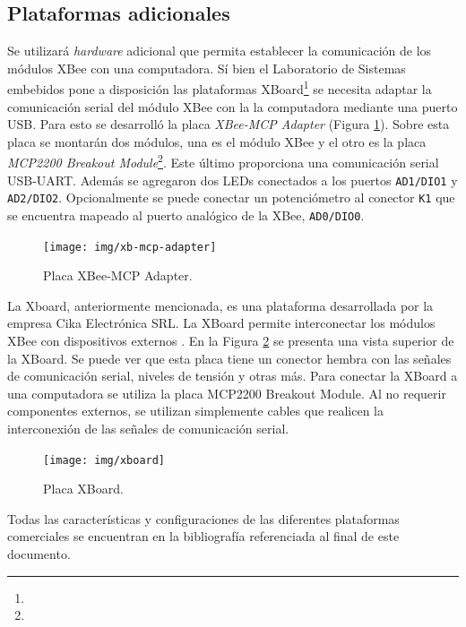 \documentclass[11pt,oneside,spanish,a4paper]{article}
\begin{document}
\subsection{Plataformas adicionales}
\label{sec:plat}

Se utilizará \textsl{hardware} adicional que permita establecer la
comunicación de los módulos XBee con una computadora. Sí bien el
Laboratorio de Sistemas embebidos pone a disposición las plataformas
XBoard\footnote{}
se necesita adaptar la comunicación serial del módulo XBee con la la
computadora mediante una puerto USB. Para esto se desarrolló la placa
\emph{XBee-MCP Adapter} (Figura \ref{fig:xb-mcp-adap}). Sobre esta
placa se montarán dos módulos, una es el módulo XBee y el otro es la
placa \emph{MCP2200 Breakout
  Module}\footnote{}. Este
último proporciona una comunicación serial USB-UART. 
Además se agregaron dos LEDs conectados a los puertos
\texttt{AD1/DIO1} y \texttt{AD2/DIO2}. Opcionalmente se puede conectar
un potenciómetro al conector \texttt{K1} que se encuentra mapeado al
puerto analógico de la XBee, \texttt{AD0/DIO0}.

\begin{figure}[h]
  \centering
  \texttt{[image: img/xb-mcp-adapter]}
  \caption{Placa XBee-MCP Adapter.}
  \label{fig:xb-mcp-adap}
\end{figure}

La Xboard, anteriormente mencionada, es una plataforma desarrollada
por la empresa Cika Electrónica SRL. La XBoard permite interconectar
los módulos XBee con dispositivos externos \cite{xboard}. En la Figura
\ref{fig:xboard} se presenta una vista superior de la XBoard. Se puede
ver que esta placa tiene un conector hembra con las señales de
comunicación serial, niveles de tensión y otras más. Para conectar la
XBoard a una computadora se utiliza la placa MCP2200 Breakout
Module. Al no requerir componentes externos, se utilizan simplemente
cables que realicen la interconexión de las señales de comunicación
serial.

\begin{figure}[h]
  \centering
  \texttt{[image: img/xboard]}
  \caption{Placa XBoard.}
  \label{fig:xboard}
\end{figure}

Todas las características y configuraciones de las diferentes
plataformas comerciales  se encuentran en la bibliografía referenciada
al final de este documento. 
\end{document}
